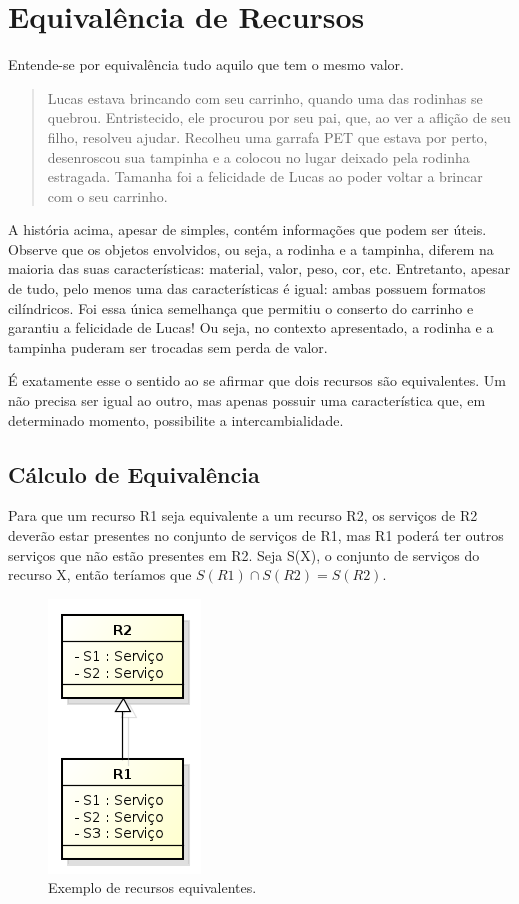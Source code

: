 \section{Equivalência de Recursos}

Entende-se por equivalência tudo aquilo que tem o mesmo valor.

\begin{quote}
	Lucas estava brincando com seu carrinho, quando uma das rodinhas se quebrou. Entristecido, ele procurou por seu pai, que, ao ver a aflição de seu filho, resolveu ajudar. Recolheu uma garrafa PET que estava por perto, desenroscou sua tampinha e a colocou no lugar deixado pela rodinha estragada. Tamanha foi a felicidade de Lucas ao poder voltar a brincar com o seu carrinho.
\end{quote}

A história acima, apesar de simples, contém informações que podem ser úteis. Observe que os objetos envolvidos, ou seja, a rodinha e a tampinha, diferem na maioria das suas características: material, valor, peso, cor, etc. Entretanto, apesar de tudo, pelo menos uma das características é igual: ambas possuem formatos cilíndricos. Foi essa única semelhança que permitiu o conserto do carrinho e garantiu a felicidade de Lucas! Ou seja, no contexto apresentado, a rodinha e a tampinha puderam ser trocadas sem perda de valor.

É exatamente esse o sentido ao se afirmar que dois recursos são equivalentes. Um não precisa ser igual ao outro, mas apenas possuir uma característica que, em determinado momento, possibilite a intercambialidade.

\subsection{Cálculo de Equivalência}

Para que um recurso R1 seja equivalente a um recurso R2, os serviços de R2 deverão estar presentes no conjunto de serviços de R1, mas R1 poderá ter outros serviços que não estão presentes em R2. Seja S(X), o conjunto de serviços do recurso X, então teríamos que $S(R1) \cap S(R2) = S(R2)$. 

\begin{figure}[ht]
	\center
	\includegraphics[scale=0.6]{imagens/equivalenciaDeRecursos}
	\caption{Exemplo de recursos equivalentes.}
	\label{fig:equivalenciaDeRecursos}
\end{figure}

